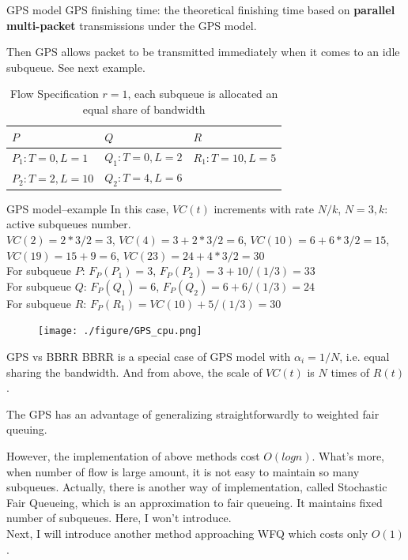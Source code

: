 \documentclass[10pt]{beamer}
\begin{document}
\begin{frame}{GPS model}
GPS finishing time: the theoretical finishing time based on \textbf{parallel multi-packet} transmissions under the GPS model. 

Then GPS allows packet to be transmitted immediately when it comes to an idle subqueue. See next example. 
\begin{table}
\caption{Flow Specification $r=1$, each subqueue is allocated an equal share of bandwidth}
\begin{tabular}{lll}
\toprule
$P$ & $Q$ & $R$ \\
\midrule
$P_1: T =0, L=1$ & $Q_1: T=0, L=2$& $R_1:T=10, L=5$\\
$P_2:T=2, L=10$ & $Q_2:T=4, L=6$ & \\
\bottomrule
\end{tabular}
\end{table}
\end{frame}

\begin{frame}{GPS model--example}
In this case, $VC(t)$ increments with rate $N/k$, $N=3, k:$ active subqueues number. \\
$VC(2) = 2*3/2=3$, 
$VC(4) = 3+2*3/2 = 6$,
$VC(10) = 6+6*3/2 = 15$,
$VC(19) = 15+9 = 6$,
$VC(23) = 24+4*3/2 = 30$ \\
For subqueue $P$:
$F_P(P_1) = 3$, 
$F_P(P_2) = 3+10/(1/3) = 33$\\
For subqueue $Q$:
$F_P(Q_1) = 6$, 
$F_P(Q_2) = 6+6/(1/3) = 24$\\
For subqueue $R$:
$F_P(R_1) = VC(10) + 5/(1/3) = 30$\\
\begin{figure}
\texttt{[image: ./figure/GPS\_cpu.png]}
\end{figure}
\end{frame}

\begin{frame}{GPS vs BBRR}
BBRR is a special case of GPS model with $\alpha_i = 1/N$, i.e. equal sharing the bandwidth.
And from above, the scale of $VC(t)$ is $N$ times of $R(t)$.

The GPS has an advantage of generalizing straightforwardly to weighted fair queuing.

However, the implementation of above methods cost $O(logn)$. 
What's more, when number of flow is large amount, it is not easy to maintain so many subqueues.
Actually, there is another way of implementation, called Stochastic Fair Queueing, which is an approximation to fair queueing. It maintains fixed number of subqueues. Here, I won't introduce. \\
Next, I will introduce another method approaching WFQ which costs only $O(1)$. 
\end{frame}
\end{document}
